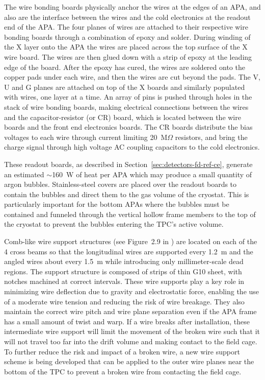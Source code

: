 The wire bonding boards physically anchor the wires at the edges of an
APA, and also are the interface between the wires and the cold
electronics at the readout end of the APA.  The four planes of wires
are attached to their respective wire bonding boards through a
combination of epoxy and solder. During winding of the X layer onto
the APA the wires are placed across the top surface of the X wire
board. The wires are then glued down with a strip of epoxy at the
leading edge of the board.  After the epoxy has cured, the wires are
soldered onto the copper pads under each wire, and then the wires are
cut beyond the pads. The V, U and G planes are attached on top of the
X boards and similarly populated with wires, one layer at a time. An
array of pins is pushed through holes in the stack of wire bonding
boards, making electrical connections between the wires and the
capacitor-resistor (or CR) board, which is located between the wire
boards and the front end electronics boards.  The CR boards distribute
the bias voltages to each wire through current limiting 20~M$\Omega$
resistors, and bring the charge signal through high voltage AC
coupling capacitors to the cold electronics.

These readout boards, as described in
Section~\ref{sec:detectors-fd-ref-ce}, generate an estimated
$\sim$160~W of heat per APA which may produce a small quantity of
argon bubbles.  Stainless-steel covers are placed over the readout
boards to contain the bubbles and direct them to the gas volume of the
cryostat. This is particularly important for the bottom APAs where the
bubbles must be contained and funneled through the vertical hollow
frame members to the top of the cryostat to prevent the bubbles
entering the TPC's active volume.

Comb-like wire support structures (see Figure~2.9 in \anxlbnefd) are
located on each of the 4 cross beams so that the longitudinal wires
are supported every 1.2~m and the angled wires about every 1.5~m while
introducing only millimeter-scale dead regions. The support structure
is composed of strips of thin G10 sheet, with notches machined at
correct intervals.  These wire supports play a key role in minimizing
wire deflection due to gravity and electrostatic force, enabling the
use of a moderate wire tension and reducing the risk of wire breakage.
They also maintain the correct wire pitch and wire plane separation
even if the APA frame has a small amount of twist and warp.  If a wire
breaks after installation, these intermediate wire support will limit
the movement of the broken wire such that it will not travel too far
into the drift volume and making contact to the field cage.  To
further reduce the risk and impact of a broken wire, a new wire
support scheme is being developed that can be applied to the outer
wire planes near the bottom of the TPC to prevent a broken wire from
contacting the field cage.


